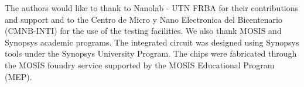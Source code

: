 The authors would like to thank to Nanolab - UTN FRBA for their contributions and support and to the Centro de Micro y Nano Electronica del Bicentenario (CMNB-INTI) \cite{cmnb} for the use of the testing facilities. 
We also thank MOSIS and Synopsys academic programs.
The integrated circuit was designed using Synopsys \cite{synopsys} tools under the Synopsys University Program. The chips were fabricated through the MOSIS foundry service supported by the MOSIS Educational Program (MEP).